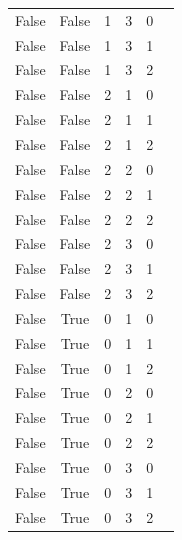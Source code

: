 {\begin{longtable}{c | c | c | c | c | c}
		False & False & 1 & 3 & 0 &  \\
		False & False & 1 & 3 & 1 &  \\
		False & False & 1 & 3 & 2 &  \\
		False & False & 2 & 1 & 0 &  \\
		False & False & 2 & 1 & 1 &  \\
		False & False & 2 & 1 & 2 &  \\
		False & False & 2 & 2 & 0 &  \\
		False & False & 2 & 2 & 1 &  \\
		False & False & 2 & 2 & 2 &  \\
		False & False & 2 & 3 & 0 &  \\
		False & False & 2 & 3 & 1 &  \\
		False & False & 2 & 3 & 2 &  \\
		False & True & 0 & 1 & 0 &  \\
		False & True & 0 & 1 & 1 &  \\
		False & True & 0 & 1 & 2 &  \\
		False & True & 0 & 2 & 0 &  \\
		False & True & 0 & 2 & 1 &  \\
		False & True & 0 & 2 & 2 &  \\
		False & True & 0 & 3 & 0 &  \\
		False & True & 0 & 3 & 1 &  \\
		False & True & 0 & 3 & 2 &  \\

\end{longtable}}
